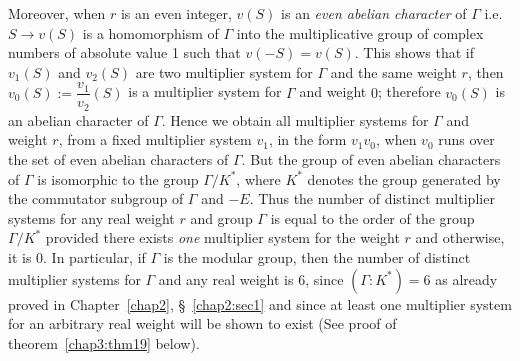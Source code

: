 Moreover, when $r$ is an even integer, $v(S)$ is an \textit{even
abelian character} of $\Gamma$ i.e. $S \to v(S)$ is a homomorphism
of $\Gamma$ into the multiplicative group of complex numbers of
absolute value 1 such that $v(-S)=v(S)$. This shows that if $v_1(S)$
and $v_2(S)$ are two multiplier system for $\Gamma$ and the same
weight $r$, then $v_0(S):=\dfrac{v_1}{v_2}(S)$ is a multiplier system
for $\Gamma$ and weight $0$; therefore $v_0(S)$ is an abelian
character of $\Gamma$. Hence we obtain all multiplier systems for
$\Gamma$ and weight $r$, from a fixed multiplier system $v_1$, in the
form $v_1v_0$, when $v_0$ runs over the set of even abelian characters
of $\Gamma$. But the group of even abelian characters of $\Gamma$ is
isomorphic to the group $\Gamma/K^{\ast}$, where $K^{\ast}$ denotes
the group generated by the commutator \pageoriginale subgroup of
$\Gamma$ and $-E$. Thus the number of distinct multiplier systems for
any real weight $r$ and group $\Gamma$ is equal to the order of the
group $\Gamma/K^{\ast}$ provided there exists \textit{one} multiplier
system for the weight $r$ and otherwise, it is 0. In particular, if
$\Gamma$ is the modular group, then the number of distinct multiplier
systems for $\Gamma$ and any real weight is 6, since
$(\Gamma:K^{\ast})=6$ as already proved in Chapter~\ref{chap2}, \S~\ref{chap2:sec1} 
and since at least one multiplier system for an arbitrary real weight will be
shown to exist (See proof of theorem~\ref{chap3:thm19} below).

